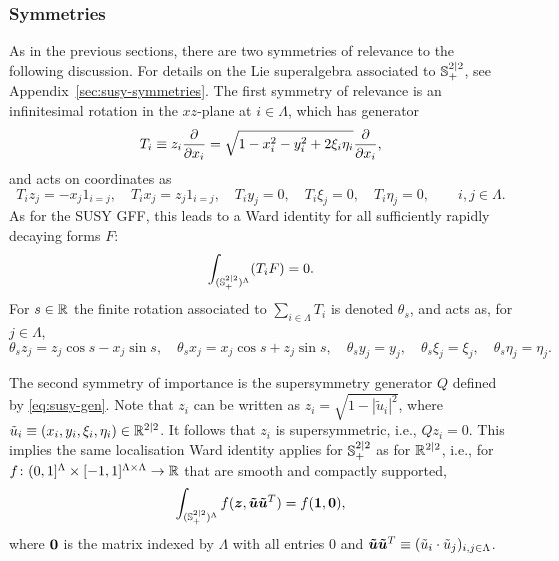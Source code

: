 \documentclass[11pt,a4paper]{article}
\begin{document}
\subsubsection{Symmetries}
As in the previous sections, there are two
symmetries of relevance to the following discussion.
For details on the Lie superalgebra associated to
${\mathbb S}^{2|2}_{+}$, see Appendix~\ref{sec:susy-symmetries}.
The first symmetry of relevance is an
infinitesimal rotation in the $xz$-plane at $i\in\Lambda$, which has
generator
\begin{equation}
T_i \equiv z_i \frac{\partial }{\partial x_i} = \sqrt{1-x_i^2-y_i^2+2\xi_i\eta_i}\frac{\partial }{\partial x_i},
\end{equation}
and acts on coordinates as
\begin{equation}
T_iz_j = -x_j1_{i=j},\quad T_ix_j = z_j1_{i=j},\quad  T_iy_j = 0,\quad
T_i\xi_j = 0,\quad T_i\eta_j = 0, \qquad i,j\in\Lambda.
\end{equation}
As for the SUSY GFF, this leads to a Ward identity
for all sufficiently rapidly decaying forms $F$:
\begin{equation}
  \label{eq:IBP-SUSY-S22}
  \int_{({\mathbb S}^{2|2}_{+})^{\Lambda}} (T_{i}F) = 0  .
\end{equation}
For $s\in\mathbb{R}$ the finite rotation associated to $\sum_{i\in\Lambda} T_i$ is denoted
$\theta_s$, and acts as, for $j\in\Lambda$,
\begin{equation}
\theta_s z_j = z_j\cos{s} - x_j\sin{s},\quad \theta_sx_j = x_j\cos{s} + z_j\sin{s},\quad  \theta_sy_j = y_j,\quad \theta_s\xi_j = \xi_j,\quad \theta_s\eta_j = \eta_j.
\end{equation}

The second symmetry of importance is the supersymmetry generator
$Q$ defined by \eqref{eq:susy-gen}.  Note that $z_i$ can be written as
$z_i = \sqrt{1- |\tilde u_i|^2}$, where
$\tilde u_i \equiv (x_i,y_i,\xi_i,\eta_i) \in \mathbb{R}^{2|2}$. It follows
that $z_i$ is supersymmetric, i.e., $Qz_i=0$. This implies the
same localisation Ward identity applies for ${\mathbb S}^{2|2}_+$ as for
$\mathbb{R}^{2|2}$, i.e., for $f\colon (0,1]^{\Lambda}\times
[-1,1]^{\Lambda\times\Lambda}\to \mathbb{R}$ that are smooth and compactly supported, 
\begin{equation}
  \label{eq:s22loc}
  \int_{({\mathbb S}^{2|2}_{+})^{\Lambda}} f(\boldsymbol{z},\boldsymbol{\tilde  u}\boldsymbol{\tilde u}^T) =  f(\boldsymbol{1},\boldsymbol{0}),
\end{equation}
where $\boldsymbol{0}$ is the matrix indexed by $\Lambda$ with all entries $0$
and $\boldsymbol{\tilde u}\boldsymbol{\tilde u}^{T} \equiv (\tilde u_{i}\cdot \tilde u_{j})_{i,j\in\Lambda}$.
\end{document}
